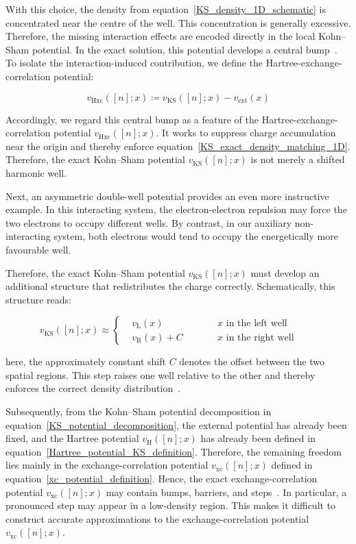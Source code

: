 With this choice, the density from equation~\eqref{KS_density_1D_schematic} is concentrated near the centre of the well.
This concentration is generally excessive.
Therefore, the missing interaction effects are encoded directly in the local Kohn--Sham potential.
In the exact solution, this potential develops a central bump~\cite{helbig2009exact}.
To isolate the interaction-induced contribution,
we define the Hartree-exchange-correlation potential:

\begin{equation}
    v_\mathrm{Hxc}([n];x)\coloneqq
    v_\mathrm{KS}([n];x)-v_\mathrm{ext}(x)
\label{Hxc_potential_definition_1D}
\end{equation}

Accordingly, we regard this central bump as a feature of the Hartree-exchange-correlation potential $v_\mathrm{Hxc}([n];x)$.
It works to suppress charge accumulation near the origin and thereby enforce equation~\eqref{KS_exact_density_matching_1D}.
Therefore, the exact Kohn--Sham potential $v_\mathrm{KS}([n];x)$ is not merely a shifted harmonic well.

Next, an asymmetric double-well potential provides an even more instructive example.
In this interacting system,
the electron-electron repulsion may force the two electrons to occupy different wells.
By contrast, in our auxiliary non-interacting system,
both electrons would tend to occupy the energetically more favourable well.

Therefore, the exact Kohn--Sham potential $v_\mathrm{KS}([n];x)$ must develop an additional structure that redistributes the charge correctly.
Schematically, this structure reads:

\begin{equation}
v_\mathrm{KS}([n];x)\approx\left\{
\begin{aligned}
    &v_\mathrm{L}(x)      &&\qquad \text{$x$ in the left well} \\
    &v_\mathrm{R}(x)+C    &&\qquad \text{$x$ in the right well}
\end{aligned}\right.
\qquad
\label{KS_step_structure_schematic}
\end{equation}

here, the approximately constant shift $C$ denotes the offset between the two spatial regions.
This step raises one well relative to the other and thereby enforces the correct density distribution~\cite{makmal2011dissociation}.

Subsequently, from the Kohn--Sham potential decomposition in equation~\eqref{KS_potential_decomposition},
the external potential has already been fixed, and the Hartree potential $v_\mathrm{H}([n];x)$ has already been defined in equation~\eqref{Hartree_potential_KS_definition}.
Therefore, the remaining freedom lies mainly in the exchange-correlation potential $v_\mathrm{xc}([n];x)$ defined in equation~\eqref{xc_potential_definition}.
Hence, the exact exchange-correlation potential $v_\mathrm{xc}([n];x)$ may contain bumps, barriers, and steps~\cite{hodgson2016origin}.
In particular, a pronounced step may appear in a low-density region.
This makes it difficult to construct accurate approximations to the exchange-correlation potential $v_\mathrm{xc}([n];x)$.

